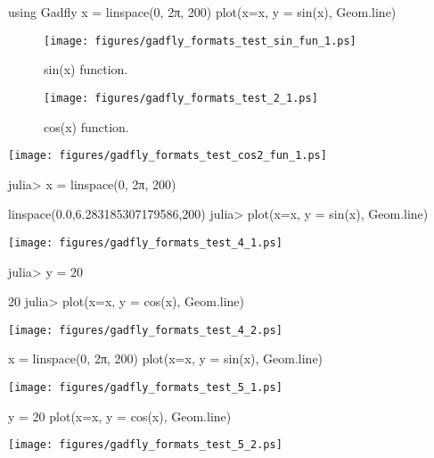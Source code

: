 


\begin{juliacode}
using Gadfly
x = linspace(0, 2π, 200)
plot(x=x, y = sin(x), Geom.line)
\end{juliacode}
\begin{figure}[ht]
\center
\texttt{[image: figures/gadfly\_formats\_test\_sin\_fun\_1.ps]}
\caption{sin(x) function.}
\label{fig:sin_fun}
\end{figure}



\begin{figure}[htpb]
\center
\texttt{[image: figures/gadfly\_formats\_test\_2\_1.ps]}
\caption{cos(x) function.}
\end{figure}



\texttt{[image: figures/gadfly\_formats\_test\_cos2\_fun\_1.ps]}



\begin{juliaterm}
julia> x = linspace(0, 2π, 200)

linspace(0.0,6.283185307179586,200)
julia> plot(x=x, y = sin(x), Geom.line)

\end{juliaterm}
\texttt{[image: figures/gadfly\_formats\_test\_4\_1.ps]}

\begin{juliaterm}
julia> y = 20

20
julia> plot(x=x, y = cos(x), Geom.line)
\end{juliaterm}
\texttt{[image: figures/gadfly\_formats\_test\_4\_2.ps]}



\begin{juliacode}
x = linspace(0, 2π, 200)
plot(x=x, y = sin(x), Geom.line)

\end{juliacode}
\texttt{[image: figures/gadfly\_formats\_test\_5\_1.ps]}

\begin{juliacode}
y = 20
plot(x=x, y = cos(x), Geom.line)
\end{juliacode}
\texttt{[image: figures/gadfly\_formats\_test\_5\_2.ps]}

